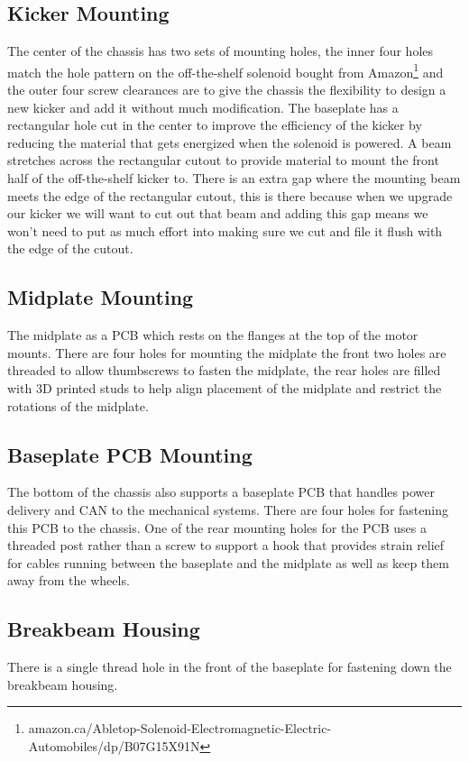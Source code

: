 \documentclass{iopart}
\begin{document}
\subsection{Kicker Mounting}
The center of the chassis has two sets of mounting holes, the inner four holes match the hole pattern on the off-the-shelf solenoid bought from Amazon\footnote{amazon.ca/Abletop-Solenoid-Electromagnetic-Electric-Automobiles/dp/B07G15X91N} and the outer four screw clearances are to give the chassis the flexibility to design a new kicker and add it without much modification. The baseplate has a rectangular hole cut in the center to improve the efficiency of the kicker by reducing the material that gets energized when the solenoid is powered. A beam stretches across the rectangular cutout to provide material to mount the front half of the off-the-shelf kicker to. There is an extra gap where the mounting beam meets the edge of the rectangular cutout, this is there because when we upgrade our kicker we will want to cut out that beam and adding this gap means we won't need to put as much effort into making sure we cut and file it flush with the edge of the cutout.


\subsection{Midplate Mounting}
The midplate as a PCB which rests on the flanges at the top of the motor mounts. There are four holes for mounting the midplate the front two holes are threaded to allow thumbscrews to fasten the midplate, the rear holes are filled with 3D printed studs to help align placement of the midplate and restrict the rotations of the midplate.

\subsection{Baseplate PCB Mounting}
The bottom of the chassis also supports a baseplate PCB that handles power delivery and CAN to the mechanical systems. There are four holes for fastening this PCB to the chassis. One of the rear mounting holes for the PCB uses a threaded post rather than a screw to support a hook that provides strain relief for cables running between the baseplate and the midplate as well as keep them away from the wheels.

\subsection{Breakbeam Housing}
There is a single thread hole in the front of the baseplate for fastening down the breakbeam housing.
\end{document}
